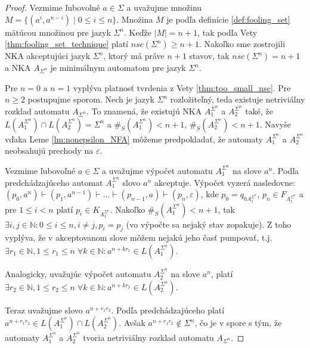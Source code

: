 \begin{proof}
Vezmime ľubovolné $ a \in \Sigma $ a uvažujme množinu $ M = \lbrace (a^i,a^{n-i}) \; | \; 0 \leq i \leq n \rbrace $. Množina $ M $ je podľa definície \ref{def:fooling_set} mätúcou množinou pre jazyk $ \Sigma^n $. Keďže $ |M| = n+1 $, tak podľa Vety \ref{thm:fooling_set_technique} platí $ nsc(\Sigma^n) \geq n+1 $. Nakoľko sme zostrojili NKA akceptujúci jazyk $ \Sigma^n $, ktorý má práve $ n+1 $ stavov, tak $ nsc(\Sigma^n) = n+1 $ a NKA $ A_{\Sigma^n} $ je minimálnym automatom pre jazyk $ \Sigma^n $.
\par
Pre $ n=0 $ a $ n=1 $ vyplýva platnosť tvrdenia z Vety \ref{thm:too_small_nsc}. Pre $ n \geq 2 $ postupujme sporom. Nech je jazyk $ \Sigma^n$ rozložiteľný, teda existuje netriviálny rozklad automatu $ A_{\Sigma^n} $. To znamená, že existujú NKA $ A_1^{\Sigma^n} $ a $ A_2^{\Sigma^n} $ také, že $ L(A_1^{\Sigma^n}) \cap L(A_2^{\Sigma^n}) = \Sigma^n $ a $ \#_S(A_1^{\Sigma^n}) < n+1 $, $ \#_S(A_2^{\Sigma^n}) < n+1 $. Navyše vďaka Leme \ref{lm:nonepsilon_NFA} môžeme predpokladať, že automaty $ A_1^{\Sigma^n} $ a $ A_2^{\Sigma^n} $ neobsahujú prechody na $ \varepsilon $. 
\par
Vezmime ľubovoľné $ a \in \Sigma $ a uvažujme výpočet automatu $ A_1^{\Sigma^n} $ na slove $ a^n $. Podľa predchádzajúceho automat $ A_1^{\Sigma^n} $ slovo $ a^n $ akceptuje. Výpočet vyzerá nasledovne: $ (p_0,a^n) \vdash (p_1, a^{n-1}) \vdash \ldots \vdash (p_{n-1}, a) \vdash (p_n, \varepsilon) $, kde $ p_0 = q_{0A_1^{\Sigma^n}}$, $ p_n \in F_{A_1^{\Sigma^n}} $ a pre $ 1 \leq i < n $ platí $ p_i \in K_{A_1^{\Sigma^n}}$. Nakoľko $ \#_S(A_1^{\Sigma^n}) < n+1 $, tak $ \exists i,j \in \mathbb{N}: 0 \leq i \leq n, i \neq j, p_i=p_j $ (vo výpočte sa nejaký stav zopakuje). Z toho vyplýva, že v akceptovanom slove môžem nejakú jeho časť pumpovať, t.j. $ \exists r_1 \in \mathbb{N}, 1 \leq r_1 \leq n \; \forall k \in \mathbb{N}: a^{n + kr_1} \in L(A_1^{\Sigma^n}) $.
\par
Analogicky, uvažujúc výpočet automatu $ A_2^{\Sigma^n} $ na slove $ a^n $, platí $ \exists r_2 \in \mathbb{N}, 1 \leq r_2 \leq n \; \forall k \in \mathbb{N}: a^{n + kr_2} \in L(A_2^{\Sigma^n}) $.
\par
Teraz uvažujme slovo $ a^{n+r_1r_2} $. Podľa predchádzajúceho platí $ a^{n+r_1r_2} \in L(A_1^{\Sigma^n}) \cap L(A_2^{\Sigma^n}) $. Avšak $ a^{n+r_1r_2} \notin \Sigma^n $, čo je v spore s tým, že automaty $ A_1^{\Sigma^n} $ a $ A_2^{\Sigma^n} $ tvoria netriviálny rozklad automatu $ A_{\Sigma^n} $.
\end{proof}

